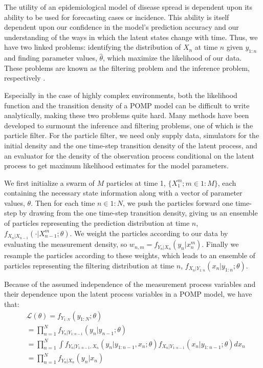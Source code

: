 \documentclass[12pt]{article}
\begin{document}
  The utility of an epidemiological model of disease spread is dependent upon its ability to be used for forecasting cases or incidence. This ability is itself dependent upon our confidence in the model's prediction accuracy and our understanding of the ways in which the latent states change with time. Thus, we have two linked problems: identifying the distribution of $X_{n}$ at time $n$ given $y_{1:n}$ and finding parameter values, $\hat{\theta}$, which maximize the likelihood of our data. These problems are known as the filtering problem and the inference problem, respectively \cite{crisan, Millar}.
  
   Especially in the case of highly complex environments, both the likelihood function and the transition density of a POMP model can be difficult to write analytically, making these two problems quite hard. Many methods have been developed to surmount the inference and filtering problems, one of which is the particle filter. For the particle filter, we need only supply data, simulators for the initial density and the one time-step transition density of the latent process, and an evaluator for the density of the observation process conditional on the latent process to get maximum likelihood estimates for the model parameters. 
     
   We first initialize a swarm of $M$ particles at time 1, $\{ X_1^m; m \in 1:M \}$, each containing the necessary state information along with a vector of parameter values, $\theta$. Then for each time $n \in 1:N$, we push the particles forward one time-step by drawing from the one time-step transition density, giving us an ensemble of particles representing the prediction distribution at time $n$, $f_{X_n|X_{n-1}}(\cdot | X_{n-1}^m; \theta)$. We weight the particles according to our data by evaluating the measurement density, so $w_{n,m} = f_{Y_n|X_n}(y_n | x_n^m)$. Finally we resample the particles according to these weights, which leads to an ensemble of particles representing the filtering distribution at time $n$, $f_{X_n | Y_{1:n}}(x_n | y_{1:n}; \theta)$.
   
    Because of the assumed independence of the measurement process variables and their dependence upon the latent process variables in a POMP model, we have that:
         \begin{equation}
         \begin{split}
         & \mathcal{L}(\theta) = f_{Y_{1:N}}(y_{1:N}; \theta) \\
         & = \prod_{n=1}^N f_{Y_{n} | Y_{1:n-1}}(y_n | y_{n-1}; \theta) \\
         & = \prod_{n=1}^N \int f_{Y_n | Y_{1:n-1}, X_n}(y_n | y_{1:n-1}, x_n; \theta)f_{X_n | Y_{1:n-1}}(x_n | y_{1:n-1}; \theta) dx_n \\
         & = \prod_{n=1}^N f_{Y_n | X_n}(y_n | x_n)
         \end{split}
         \end{equation}
   
\end{document}
